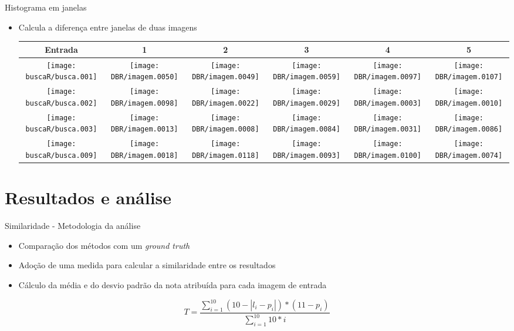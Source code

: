 \documentclass[
    style=paintings,
    paper=screen,
    blackslide,
    nopagebreaks,
    fleqn
]{powerdot}
\begin{document}
\begin{slide}{Histograma em janelas}
\begin{itemize}[type=1]
\item <1-> Calcula a diferença entre janelas de duas imagens
\vspace{-0.8cm}
\begin{table}[H]
\begin{center}
\begin{tabular}{c|ccccc}
\hline 
Entrada & 1 & 2 & 3 & 4 & 5\tabularnewline
\hline
\texttt{[image: buscaR/busca.001]} & 
\texttt{[image: DBR/imagem.0050]} & 
\texttt{[image: DBR/imagem.0049]} & 
\texttt{[image: DBR/imagem.0059]} & 
\texttt{[image: DBR/imagem.0097]} &
\texttt{[image: DBR/imagem.0107]} 
\tabularnewline
\hline 
\texttt{[image: buscaR/busca.002]} & 
\texttt{[image: DBR/imagem.0098]} & 
\texttt{[image: DBR/imagem.0022]} & 
\texttt{[image: DBR/imagem.0029]} & 
\texttt{[image: DBR/imagem.0003]} &
\texttt{[image: DBR/imagem.0010]} 
\tabularnewline
\hline 
\texttt{[image: buscaR/busca.003]} & 
\texttt{[image: DBR/imagem.0013]} & 
\texttt{[image: DBR/imagem.0008]} & 
\texttt{[image: DBR/imagem.0084]} & 
\texttt{[image: DBR/imagem.0031]} &
\texttt{[image: DBR/imagem.0086]} 
\tabularnewline
\hline 
\texttt{[image: buscaR/busca.009]} & 
\texttt{[image: DBR/imagem.0018]} & 
\texttt{[image: DBR/imagem.0118]} & 
\texttt{[image: DBR/imagem.0093]} & 
\texttt{[image: DBR/imagem.0100]} &
\texttt{[image: DBR/imagem.0074]} 
\tabularnewline
\hline 
\end{tabular}
\end{center}
\end{table}
\end{itemize}
\end{slide}


\section[slide=false]{Resultados e análise}
\begin{slide}{Similaridade - Metodologia da análise}
\begin{itemize}[type=1]
\item <1-> Comparação dos métodos com um \it{ground truth}
\item <2-> Adoção de uma medida para calcular a similaridade entre os resultados 
\item <3-> Cálculo da média e do desvio padrão da nota atribuída para cada imagem de entrada 
\end{itemize}
\pause$$T = \frac{\sum\limits_{i=1}^{10}(10-|l_i-p_i|) * (11-p_i)}{\sum\limits_{i=1}^{10}10*i}$$
\end{slide}
\end{document}
